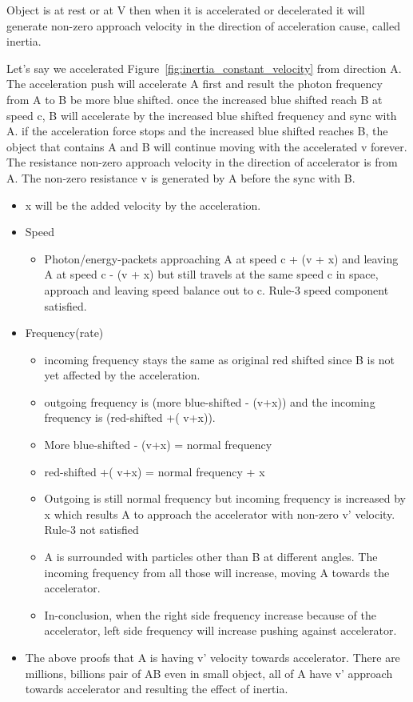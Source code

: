 \documentclass{article}
\begin{document}
    Object is at rest or at V then when it is accelerated or decelerated it will generate non-zero approach velocity in the direction of acceleration cause, called inertia.

    Let's say we accelerated Figure~\ref{fig:inertia_constant_velocity} from direction A. The acceleration push will accelerate A first and result the photon frequency from A to B be more blue shifted.
    once the increased blue shifted reach B at speed c, B will accelerate by the increased blue shifted frequency and sync with A. if the acceleration force stops and the increased blue shifted reaches B, the object that contains A and B will continue moving with the accelerated v forever.
    The resistance non-zero approach velocity in the direction of accelerator is from A.  The non-zero resistance v is generated by A before the sync with B\@.
    \begin{itemize}
        \item x will be the added velocity by the acceleration.
        \item Speed
        \begin{itemize}
            \item Photon/energy-packets  approaching A  at speed c + (v + x) and leaving A at speed c - (v + x) but still travels at the same speed c in space, approach and leaving speed balance out to c.
            Rule-3 speed component satisfied.
        \end{itemize}
        \item Frequency(rate)
        \begin{itemize}
            \item incoming frequency stays the same as original red shifted since B is not yet affected by the acceleration.
            \item outgoing frequency is (more blue-shifted - (v+x)) and the incoming frequency is (red-shifted +( v+x)).
            \item More blue-shifted - (v+x) = normal frequency
            \item red-shifted +( v+x) = normal frequency + x
            \item Outgoing is still normal frequency  but incoming frequency is increased by x which results A to approach the accelerator with non-zero v' velocity.
            Rule-3 not satisfied
            \item A is surrounded with particles other than B at different angles.
            The incoming frequency from all those will increase, moving A towards the accelerator.
            \item In-conclusion, when the right  side frequency increase because of the accelerator, left side frequency  will increase pushing against accelerator.
        \end{itemize}
        \item The above proofs that A is having v' velocity towards accelerator.
         There are millions, billions pair of AB even in small object, all of  A have v' approach towards accelerator and resulting the effect of inertia.
    \end{itemize}
\end{document}
